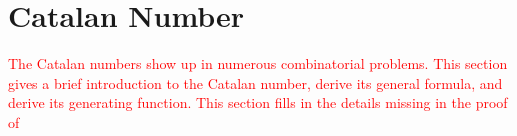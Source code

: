 \section{Catalan Number}
\textcolor{red}{The Catalan numbers show up in numerous combinatorial problems. This section gives a brief introduction to the Catalan number, derive its general formula, and derive its generating function. This section fills in the details missing in the proof of }